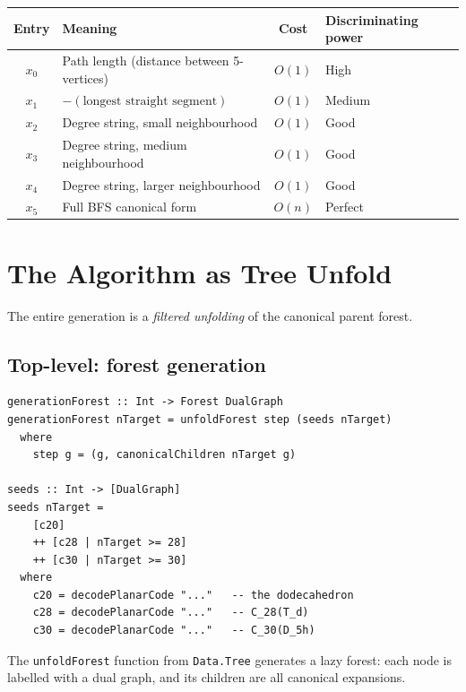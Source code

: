 \documentclass[11pt,a4paper]{article}
\theoremstyle{definition}
\begin{document}
\begin{center}
\begin{tabular}{clcl}
Entry & Meaning & Cost & Discriminating power \\
\hline
$x_0$ & Path length (distance between 5-vertices) & $O(1)$ & High \\
$x_1$ & $-(\text{longest straight segment})$ & $O(1)$ & Medium \\
$x_2$ & Degree string, small neighbourhood & $O(1)$ & Good \\
$x_3$ & Degree string, medium neighbourhood & $O(1)$ & Good \\
$x_4$ & Degree string, larger neighbourhood & $O(1)$ & Good \\
$x_5$ & Full BFS canonical form & $O(n)$ & Perfect \\
\end{tabular}
\end{center}

\section{The Algorithm as Tree Unfold}
\label{sec:unfold}

The entire generation is a \emph{filtered unfolding} of the canonical
parent forest.

\subsection{Top-level: forest generation}

\begin{lstlisting}
generationForest :: Int -> Forest DualGraph
generationForest nTarget = unfoldForest step (seeds nTarget)
  where
    step g = (g, canonicalChildren nTarget g)

seeds :: Int -> [DualGraph]
seeds nTarget =
    [c20]
    ++ [c28 | nTarget >= 28]
    ++ [c30 | nTarget >= 30]
  where
    c20 = decodePlanarCode "..."   -- the dodecahedron
    c28 = decodePlanarCode "..."   -- C_28(T_d)
    c30 = decodePlanarCode "..."   -- C_30(D_5h)
\end{lstlisting}

The \texttt{unfoldForest} function from \texttt{Data.Tree} generates a
lazy forest: each node is labelled with a dual graph, and its children
are all canonical expansions.
\end{document}
